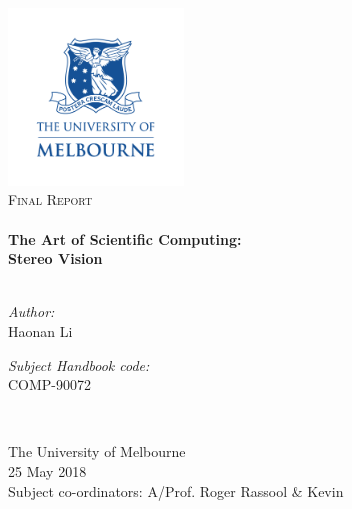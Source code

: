 \begin{titlepage}
\begin{center}

\includegraphics[width=0.35\textwidth]{figures/uom_banner.pdf}~\\[0.3cm]

\textsc{\Large Final Report}\\[0.3cm]

\HRule \\[0.3cm]
{ \huge \bfseries The Art of Scientific Computing:\\
Stereo Vision}\\[0.3cm]

\HRule \\[0.8cm]

\begin{minipage}{0.45\textwidth}
\begin{flushleft} \large
\textit{Author:}\\
Haonan Li
\end{flushleft}
\end{minipage}
\begin{minipage}{0.45\textwidth}
\begin{flushright} \large
\textit{Subject Handbook code:}\\
COMP-90072
\end{flushright}
\end{minipage}
\\[1.0cm]


\vspace{8.0cm}

The University of Melbourne
\\[0.5cm]

{\large 25 May 2018}
\\[1.5cm]

Subject co-ordinators: A/Prof. Roger Rassool \& Kevin
\\[0.8cm]


\end{center}
\end{titlepage}
